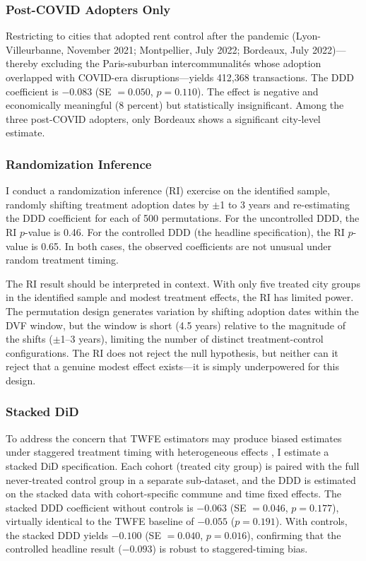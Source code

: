 \documentclass[12pt]{article}
\begin{document}
\subsubsection{Post-COVID Adopters Only}

Restricting to cities that adopted rent control after the pandemic (Lyon-Villeurbanne, November 2021; Montpellier, July 2022; Bordeaux, July 2022)---thereby excluding the Paris-suburban intercommunalit\'es whose adoption overlapped with COVID-era disruptions---yields 412,368 transactions. The DDD coefficient is $-0.083$ (SE $= 0.050$, $p = 0.110$). The effect is negative and economically meaningful (8 percent) but statistically insignificant. Among the three post-COVID adopters, only Bordeaux shows a significant city-level estimate.

\subsubsection{Randomization Inference}

I conduct a randomization inference (RI) exercise on the identified sample, randomly shifting treatment adoption dates by $\pm$1 to 3 years and re-estimating the DDD coefficient for each of 500 permutations. For the uncontrolled DDD, the RI $p$-value is 0.46. For the controlled DDD (the headline specification), the RI $p$-value is 0.65. In both cases, the observed coefficients are not unusual under random treatment timing.

The RI result should be interpreted in context. With only five treated city groups in the identified sample and modest treatment effects, the RI has limited power. The permutation design generates variation by shifting adoption dates within the DVF window, but the window is short (4.5 years) relative to the magnitude of the shifts ($\pm$1--3 years), limiting the number of distinct treatment-control configurations. The RI does not reject the null hypothesis, but neither can it reject that a genuine modest effect exists---it is simply underpowered for this design.

\subsubsection{Stacked DiD}

To address the concern that TWFE estimators may produce biased estimates under staggered treatment timing with heterogeneous effects \citep{goodmanbacon2021}, I estimate a stacked DiD specification. Each cohort (treated city group) is paired with the full never-treated control group in a separate sub-dataset, and the DDD is estimated on the stacked data with cohort-specific commune and time fixed effects. The stacked DDD coefficient without controls is $-0.063$ (SE $= 0.046$, $p = 0.177$), virtually identical to the TWFE baseline of $-0.055$ ($p = 0.191$). With controls, the stacked DDD yields $-0.100$ (SE $= 0.040$, $p = 0.016$), confirming that the controlled headline result ($-0.093$) is robust to staggered-timing bias.
\end{document}
